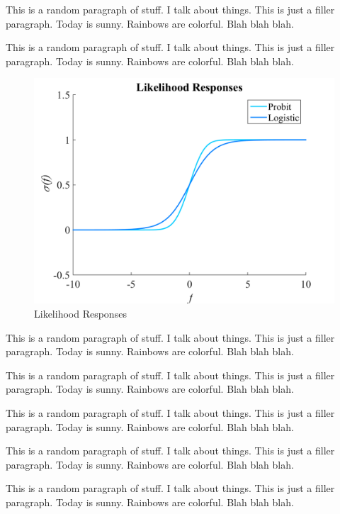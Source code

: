 \documentclass{article}
\begin{document}
		{\color{BurntOrange} This is a random paragraph of stuff. I talk about things. This is just a filler paragraph. Today is sunny. Rainbows are colorful. Blah blah blah.}
		
		{\color{BurntOrange} This is a random paragraph of stuff. I talk about things. This is just a filler paragraph. Today is sunny. Rainbows are colorful. Blah blah blah.}
		
		
		\begin{figure}[!htbp]
			\centering
				\includegraphics[width = \linewidth]{Figures/responses.png}
			\caption{Likelihood Responses}
			\label{Figure:LikelihoodResponses}
		\end{figure}
	
		{\color{BurntOrange} This is a random paragraph of stuff. I talk about things. This is just a filler paragraph. Today is sunny. Rainbows are colorful. Blah blah blah.}
		
		{\color{BurntOrange} This is a random paragraph of stuff. I talk about things. This is just a filler paragraph. Today is sunny. Rainbows are colorful. Blah blah blah.}
		
		{\color{BurntOrange} This is a random paragraph of stuff. I talk about things. This is just a filler paragraph. Today is sunny. Rainbows are colorful. Blah blah blah.}
		
		{\color{BurntOrange} This is a random paragraph of stuff. I talk about things. This is just a filler paragraph. Today is sunny. Rainbows are colorful. Blah blah blah.}
		
		{\color{BurntOrange} This is a random paragraph of stuff. I talk about things. This is just a filler paragraph. Today is sunny. Rainbows are colorful. Blah blah blah.}
		
\end{document}
